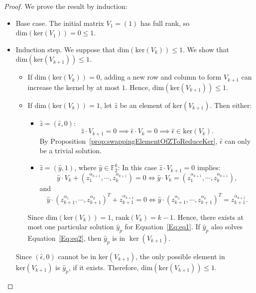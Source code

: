 \documentclass[11pt]{llncs}
\begin{document}
\begin{proof}
    We prove the result by induction:
    \begin{itemize}
        \item Base case. The initial matrix $V_1 = (1)$ has full rank, so $\text{dim}( \text{ker}(V_1)) = 0 \leq 1$.
        \item Induction step. We suppose that $\text{dim}( \text{ker}(V_k))\le 1$. We show that $\text{dim}( \text{ker}(V_{k+1}))\le 1$.
        \begin{itemize}
            \item If $\text{dim}( \text{ker}(V_k))= 0$, adding a new row and column to form $V_{k+1}$ can increase the kernel by at most $1$. Hence, $\text{dim}( \text{ker}(V_{k+1}))\le 1$.
            \item %
            If $\text{dim}( \text{ker}(V_k))= 1$, let $\hat{z}$ be an element of $\text{ker}\left(V_{k+1}\right)$. 
            Then either:
            \begin{itemize}
            	\item  \( \hat{z} = (\hat{\epsilon}, 0) \):  
\[
\hat{z} \cdot V_{k+1} = 0 \implies \hat{\epsilon} \cdot V_k = 0 \implies \hat{\epsilon} \in \text{ker}(V_k).
\]
By Proposition~\ref{prop:swappingElementOfZToReduceKer}, \( \hat{\epsilon} \) can only be a trivial solution.

\item \( \hat{z} = (\hat{y}, 1) \), where \( \hat{y} \in \mathbb{F}_2^k \):          
In this case $\hat{z} \cdot V_{k+1} = 0$ implies:
\begin{equation}\label{Eq:eq1}
 \hat{y}  \cdot V_{k} + (z_{1}^{\alpha_{k+1}}, \cdots, z_{k}^{\alpha_{k+1}}) = 0 \iff \hat{y} \cdot V_{k} = (z_{1}^{\alpha_{k+1}}, \cdots, z_{k}^{\alpha_{k+1}}),
\end{equation}
and 
\begin{equation}\label{Eq:eq2}
\hat{y} \cdot (z_{k+1}^{\alpha_1}, \cdots, z_{k+1}^{\alpha_k})^T + z_{k+1}^{\alpha_{k+1}} = 0 \iff \hat{y} \cdot (z_{k+1}^{\alpha_1}, \cdots, z_{k+1}^{\alpha_k})^T = z_{k+1}^{\alpha_{k+1}}.
\end{equation}	

        \end{itemize}
            
Since $\text{dim}(\text{ker}(V_k)) = 1$, $\text{rank}(V_k) = k-1$. Hence, there exists at most one particular solution $\hat{y}_p$ for Equation~\ref{Eq:eq1}. 
If \( \hat{y}_p \) also solves Equation~\ref{Eq:eq2}, then \( \hat{y}_p \) is in \( \ker(V_{k+1}) \).
 
\end{itemize}
Since $(\hat{\epsilon}, 0)$  cannot be in \( \text{ker}(V_{k+1}) \), the only possible element in \( \text{ker}(V_{k+1}) \) is \( \hat{y}_p \), if it exists. Therefore, \( \text{dim}(\text{ker}(V_{k+1})) \leq 1 \).
        \end{itemize}

\end{proof}
\end{document}

